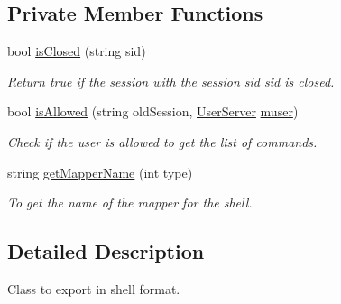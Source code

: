 \subsection*{Private Member Functions}
\begin{DoxyCompactItemize}
\item 
bool \hyperlink{classShellExporter_a34c15b723028388a012d3a3d98ff45c6}{isClosed} (string sid)
\begin{DoxyCompactList}\small\item\em Return true if the session with the session sid sid is closed. \item\end{DoxyCompactList}\item 
\hypertarget{classShellExporter_a69c43895e458b5a20a6932f12a161898}{
bool \hyperlink{classShellExporter_a69c43895e458b5a20a6932f12a161898}{isAllowed} (string oldSession, \hyperlink{classUserServer}{UserServer} \hyperlink{classExportServer_a32a72db97a80e0a6c8e30eb2dfa780fd}{muser})}
\label{classShellExporter_a69c43895e458b5a20a6932f12a161898}

\begin{DoxyCompactList}\small\item\em Check if the user is allowed to get the list of commands. \item\end{DoxyCompactList}\item 
\hypertarget{classShellExporter_afcd5c22d37a16e62713acf79dfab338b}{
string \hyperlink{classShellExporter_afcd5c22d37a16e62713acf79dfab338b}{getMapperName} (int type)}
\label{classShellExporter_afcd5c22d37a16e62713acf79dfab338b}

\begin{DoxyCompactList}\small\item\em To get the name of the mapper for the shell. \item\end{DoxyCompactList}\end{DoxyCompactItemize}


\subsection{Detailed Description}
Class to export in shell format. 

